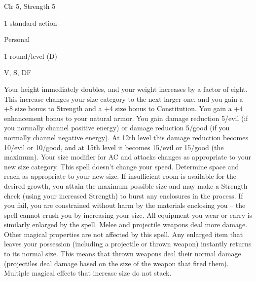 
\begin{description*}
\item[Level:] Clr 5, Strength 5
\item[Casting Time:] 1 standard action
\item[Range:] Personal
\item[Duration:] 1 round/level (D)
\item[Components:] V, S, DF
\end{description*}

Your height immediately doubles, and your weight increases by a factor of eight.
This increase changes your size category to the next larger one, and you gain a
+8 size bonus to Strength and a +4 size bonus to Constitution. You gain a +4 enhancement
bonus to your natural armor. You gain damage reduction 5/evil (if you normally
channel positive energy) or damage reduction 5/good (if you normally channel negative
energy). At 12th level this damage reduction becomes 10/evil or 10/good, and at
15th level it becomes 15/evil or 15/good (the maximum). Your size modifier for
AC and attacks changes as appropriate to your new size category. This spell doesn't
change your speed.  Determine space and reach as appropriate to your new size.
If insufficient room is available for the desired growth, you attain the maximum
possible size and may make a Strength check (using your increased Strength) to
burst any enclosures in the process. If you fail, you are constrained without harm
by the materials enclosing you --  the spell cannot crush you by increasing your
size.
All equipment you wear or carry is similarly enlarged by the spell. Melee and projectile
weapons deal more damage. Other magical properties are not affected by this spell.
Any enlarged item that leaves your possession (including a projectile or thrown
weapon) instantly returns to its normal size. This means that thrown weapons deal
their normal damage (projectiles deal damage based on the size of the weapon that
fired them).
Multiple magical effects that increase size do not stack.
